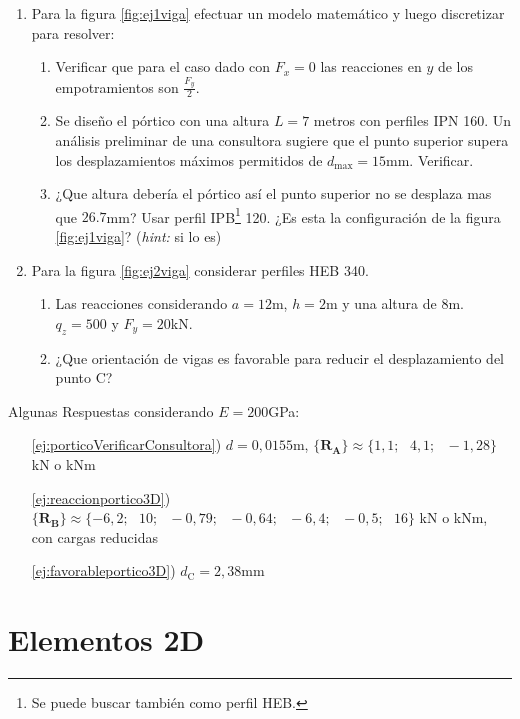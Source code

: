 \documentclass[11pt, a4paper,titlepage]{article}
\newcommand{\ms}{\ \ \ } %
\newcommand{\Cme}[1]{\boldsymbol{\{ }\mathbf{#1} \boldsymbol{\}} }
\begin{document}
\begin{enumerate}
	\item Para la figura \ref{fig:ej1viga} efectuar un modelo matemático y luego discretizar para resolver:
	\begin{enumerate}
		\item Verificar que para el caso dado con $F_x=0$ las reacciones en $y$ de los empotramientos son $\frac{F_y}{2}$.
		\item Se diseño el pórtico con una altura $L=7$ metros con perfiles IPN 160. Un análisis preliminar de una consultora sugiere que el punto superior supera los desplazamientos máximos permitidos de $d_{\max}=15$mm. Verificar.\label{ej:porticoVerificarConsultora}
		\item ¿Que altura debería el pórtico así el punto superior no se desplaza mas que $26.7$mm? Usar perfil IPB\footnote{Se puede buscar también como perfil HEB.} 120. ¿Es esta la configuración de la figura \ref{fig:ej1viga}? (\textit{hint:} si lo es)\label{ej:probvigaaltura}
	\end{enumerate}
	\item Para la figura \ref{fig:ej2viga} considerar perfiles HEB 340. 
	\begin{enumerate}
		\item Las reacciones considerando $a=12$m, $h=2$m  y una altura de $8$m. $q_z=500$ y $F_y=20$kN. \label{ej:reaccionportico3D}
		\item ¿Que orientación de vigas es favorable para reducir el desplazamiento del punto C?\label{ej:favorableportico3D} 
	\end{enumerate}
\end{enumerate}
Algunas Respuestas considerando $E=200$GPa:
\begin{itemize}
	\item[\ref{ej:porticoVerificarConsultora})]$d=0,0155$m, $\Cme{R_A}\approx\{1,1;\ms4,1;\ms-1,28\}$ kN o kNm
	
	\item[\ref{ej:reaccionportico3D})] $\Cme{R_B}\approx
	\{-6,2;\ms    10;\ms   -0,79;\ms   -0,64;\ms   -6,4;\ms   -0,5;\ms   16\}$ kN o kNm, con cargas reducidas
	
	\item[\ref{ej:favorableportico3D})] $d_{\mathrm{C}}=2,38$mm
	
\end{itemize}
\clearpage
\part{Elementos 2D}
\end{document}
